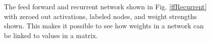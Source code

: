 \begin{figure}[h]
\caption[Simbrain screenshots modified by Jeff Yoshimi.]{The feed forward and recurrent network shown in Fig. \ref{ffRecurrent} with zeroed out activations, labeled nodes, and weight strengths shown. This makes it possible to see how weights in a network can be linked to values in a matrix.}
\label{labelledNets}
\end{figure}

